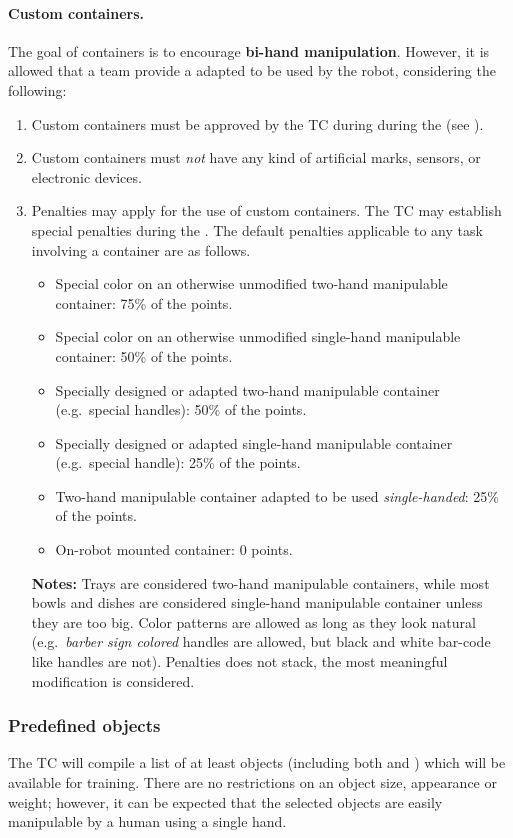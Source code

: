 \paragraph*{Custom containers.}
\label{rule:custom_containers}
The goal of containers is to encourage \textbf{bi-hand manipulation}. However, it is allowed that a team provide a  adapted to be used by the robot, considering the following:
\begin{enumerate}
	\item Custom containers must be approved by the TC during during the  (see ).
	\item Custom containers must \emph{not} have any kind of artificial marks, sensors, or electronic devices.
	\item Penalties may apply for the use of custom containers. The TC may establish special penalties during the . The default penalties applicable to any task involving a container are as follows.
	\begin{itemize}
	\item Special color on an otherwise unmodified two-hand manipulable container: 75\% of the points.
	\item Special color on an otherwise unmodified single-hand manipulable container: 50\% of the points.
	\item Specially designed or adapted two-hand manipulable container (e.g.~special handles): 50\% of the points.
	\item Specially designed or adapted single-hand manipulable container (e.g.~special handle): 25\% of the points.
	\item Two-hand manipulable container adapted to be used \textit{single-handed}: 25\% of the points.
	\item On-robot mounted container: 0 points.
	\end{itemize}
	\textbf{Notes:} Trays are considered two-hand manipulable containers, while most bowls and dishes are considered single-hand manipulable container unless they are too big. Color patterns are allowed as long as they look natural (e.g.~\textit{barber sign colored} handles are allowed, but black and white bar-code like handles are not). Penalties does not stack, the most meaningful modification is considered. 
\end{enumerate}

\subsubsection{Predefined objects}
The TC will compile a list of at least \NumObjects objects (including both  and ) which will be available for training. There are no restrictions on an object size, appearance or weight; however, it can be expected that the selected objects are easily manipulable by a human using a single hand.

